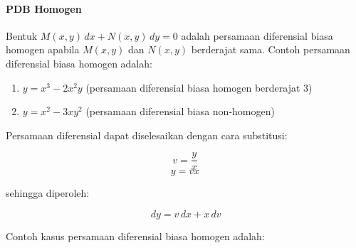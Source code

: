 \paragraph{PDB Homogen}
\label{par:PDBHomo}

Bentuk \begin{math} M(x, y) \, dx + N(x, y) \, dy = 0 \end{math} adalah persamaan diferensial biasa homogen apabila \begin{math} M(x, y) \end{math} dan \begin{math} N(x, y) \end{math} berderajat sama. Contoh persamaan diferensial biasa homogen adalah:

\begin{enumerate}[1.]

	\item \begin{math} y = x^{3} - 2x^{2}y \end{math} (persamaan diferensial biasa homogen berderajat 3)
	\item \begin{math} y = x^{2} - 3xy^{2} \end{math} (persamaan diferensial biasa non-homogen)

\end{enumerate}

Persamaan diferensial dapat diselesaikan dengan cara substitusi:

\begin{displaymath} v = \dfrac{y}{x} \end{displaymath}
\begin{displaymath} y = vx \end{displaymath}

sehingga diperoleh:

\begin{equation} \, dy = v \, dx + x \, dv \end{equation}

Contoh kasus persamaan diferensial biasa homogen adalah:

